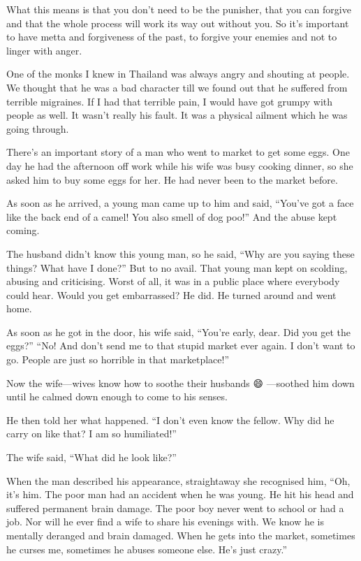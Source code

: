 \documentclass[12pt, openany]{book}
\begin{document}
What this means is that you don’t need to be the punisher, that you can forgive and that the whole process will work its way out without you. So it’s important to have metta and forgiveness of the past, to forgive your enemies and not to linger with anger. 

One of the monks I knew in Thailand was always angry and shouting at people. We thought that he was a bad character till we found out that he suffered from terrible migraines. If I had that terrible pain, I would have got grumpy with people as well. It wasn’t really his fault. It was a physical ailment which he was going through. 

There’s an important story of a man who went to market to get some eggs. One day he had the afternoon off work while his wife was busy cooking dinner, so she asked him to buy some eggs for her. He had never been to the market before. 

As soon as he arrived, a young man came up to him and said, “You’ve got a face like the back end of a camel! You also smell of dog poo!” And the abuse kept coming. 

The husband didn’t know this young man, so he said, “Why are you saying these things? What have I done?” But to no avail. That young man kept on scolding, abusing and criticising. Worst of all, it was in a public place where everybody could hear. Would you get embarrassed? He did. He turned around and went home. 

As soon as he got in the door, his wife said, “You’re early, dear. Did you get the eggs?” “No! And don’t send me to that stupid market ever again. I don’t want to go. People are just so horrible in that marketplace!” 

Now the wife—wives know how to soothe their husbands 😄 —soothed him down until he calmed down enough to come to his senses. 

He then told her what happened. “I don’t even know the fellow. Why did he carry on like that? I am so humiliated!” 

The wife said, “What did he look like?” 

When the man described his appearance, straightaway she recognised him, “Oh, it’s him. The poor man had an accident when he was young. He hit his head and suffered permanent brain damage. The poor boy never went to school or had a job. Nor will he ever find a wife to share his evenings with. We know he is mentally deranged and brain damaged. When he gets into the market, sometimes he curses me, sometimes he abuses someone else. He’s just crazy.” 
\end{document}
